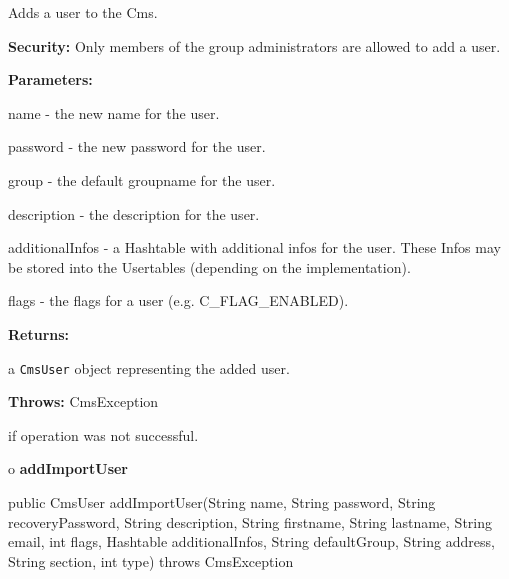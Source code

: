 \begin{description}
\htmlDD Adds a user to the Cms.

{\bf Security:} Only members of the group administrators are allowed to add a
user.

\begin{description}
\item {\bf Parameters:}

name - the new name for the user.

password - the new password for the user.

group - the default groupname for the user.

description - the description for the user.

additionalInfos - a Hashtable with additional infos for the user. These Infos
may be stored into the Usertables (depending on the implementation).

flags - the flags for a user (e.g. C\_FLAG\_ENABLED).
\item {\bf Returns:}

a {\tt CmsUser} object representing the added user.
\item {\bf Throws:} CmsException

if operation was not successful.
\end{description}

\end{description}

o {\bf addImportUser}

\begin{PRE}
 public CmsUser addImportUser(String name,
                              String password,
                              String recoveryPassword,
                              String description,
                              String firstname,
                              String lastname,
                              String email,
                              int flags,
                              Hashtable additionalInfos,
                              String defaultGroup,
                              String address,
                              String section,
                              int type) throws CmsException
\end{PRE}

